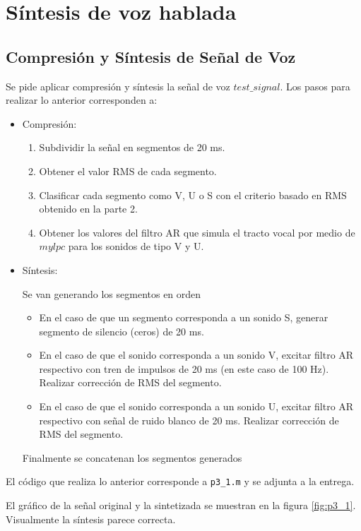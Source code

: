\section{Síntesis de voz hablada}


\subsection{Compresión y Síntesis de Señal de Voz}

Se pide aplicar compresión y síntesis la señal de voz $test\_signal$. Los pasos para realizar lo anterior corresponden a:
\begin{itemize}
    \item Compresión:
    \begin{enumerate}
        \item Subdividir la señal en segmentos de 20 ms.
        \item Obtener el valor RMS de cada segmento.
        \item Clasificar cada segmento como V, U o S con el criterio basado en RMS obtenido en la parte 2.
        \item Obtener los valores del filtro AR que simula el tracto vocal por medio de $mylpc$ para los sonidos de tipo V y U.
    \end{enumerate}
    \item Síntesis:
    
    Se van generando los segmentos en orden
    \begin{itemize}
        \item En el caso de que un segmento corresponda a un sonido S, generar segmento de silencio (ceros) de 20 ms.
        \item En el caso de que el sonido corresponda a un sonido V, excitar filtro AR respectivo con tren de impulsos de 20 ms (en este caso de 100 Hz).  Realizar corrección de RMS del segmento.
        \item En el caso de que el sonido corresponda a un sonido U, excitar filtro AR respectivo con señal de ruido blanco de 20 ms.  Realizar corrección de RMS del segmento.
    \end{itemize}
    Finalmente se concatenan los segmentos generados
\end{itemize}

El código que realiza lo anterior corresponde a \texttt{p3\_1.m} y se adjunta a la entrega.
 
El gráfico de la señal original y la sintetizada se muestran en la figura \ref{fig:p3_1}. Visualmente la síntesis parece correcta.

